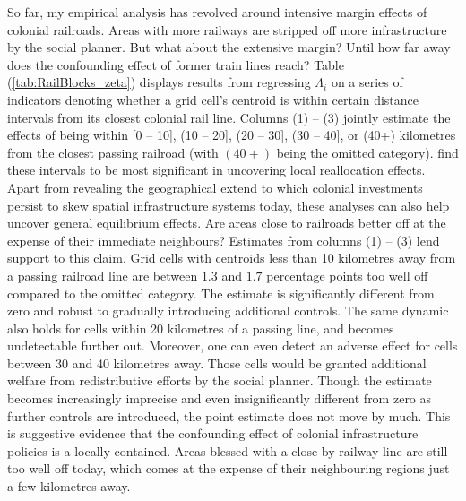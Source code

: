 \documentclass[11pt, oneside]{article}   	%
\let\oldref\ref
\renewcommand{\ref}[1]{(\oldref{#1})}
\begin{document}

So far, my empirical analysis has revolved around intensive margin effects of colonial railroads. Areas with more railways are stripped off more infrastructure by the social planner. But what about the extensive margin? Until how far away does the confounding effect of former train lines reach? Table \ref{tab:RailBlocks_zeta} displays results from regressing $\Lambda_{i}$ on a series of indicators denoting whether a grid cell's centroid is within certain distance intervals from its closest colonial rail line. Columns (1) -- (3) jointly estimate the effects of being within [0 -- 10], (10 -- 20], (20 -- 30], (30 -- 40], or (40+) kilometres from the closest passing railroad (with $(40+)$ being the omitted category). \cite{jedwab_permanent_2016} find these intervals to be most significant in uncovering local reallocation effects. Apart from revealing the geographical extend to which colonial investments persist to skew spatial infrastructure systems today, these analyses can also help uncover general equilibrium effects. Are areas close to railroads better off at the expense of their immediate neighbours? Estimates from columns (1) -- (3) lend support to this claim. Grid cells with centroids less than 10 kilometres away from a passing railroad line are between $1.3$ and $1.7$ percentage points too well off compared to the omitted category. The estimate is significantly different from zero and robust to gradually introducing additional controls. The same dynamic also holds for cells within 20 kilometres of a passing line, and becomes undetectable further out. Moreover, one can even detect an adverse effect for cells between 30 and 40 kilometres away. Those cells would be granted additional welfare from redistributive efforts by the social planner. Though the estimate becomes increasingly imprecise and even insignificantly different from zero as further controls are introduced, the point estimate does not move by much. This is suggestive evidence that the confounding effect of colonial infrastructure policies is a locally contained. Areas blessed with a close-by railway line are still too well off today, which comes at the expense of their neighbouring regions just a few kilometres away.
\end{document}
